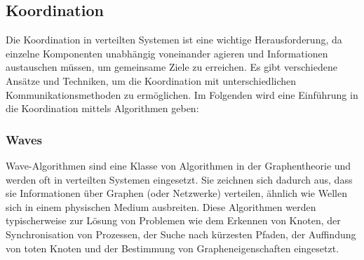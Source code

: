 \subsection{Koordination}

Die Koordination in verteilten Systemen ist eine wichtige Herausforderung, da einzelne Komponenten unabhängig voneinander agieren und Informationen austauschen müssen, um gemeinsame Ziele zu erreichen. Es gibt verschiedene Ansätze und Techniken, um die Koordination mit unterschiedlichen Kommunikationsmethoden zu ermöglichen. Im Folgenden wird eine Einführung in die Koordination mittels Algorithmen geben:

\subsubsection{Waves}
Wave-Algorithmen sind eine Klasse von Algorithmen in der Graphentheorie und werden oft in verteilten Systemen eingesetzt. Sie zeichnen sich dadurch aus, dass sie Informationen über Graphen (oder Netzwerke) verteilen, ähnlich wie Wellen sich in einem physischen Medium ausbreiten. Diese Algorithmen werden typischerweise zur Lösung von Problemen wie dem Erkennen von Knoten, der Synchronisation von Prozessen, der Suche nach kürzesten Pfaden, der Auffindung von toten Knoten und der Bestimmung von Grapheneigenschaften eingesetzt.

